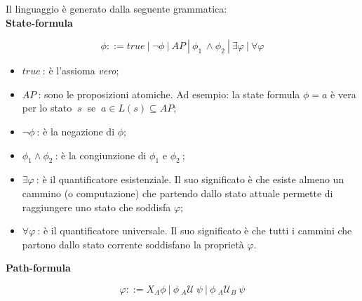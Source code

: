 \noindent Il linguaggio è generato dalla seguente grammatica:
\\

\textbf{{State-formula}}

\begin{equation}
 \phi ::= true\ |\ \neg \phi\ |\ AP\ |\ \phi_1 \ \wedge \phi_2\ |\ \exists\varphi\ |\ \forall\varphi
\end{equation}

\begin{itemize}
 \item $true\ $: è l'assioma \emph{vero};
 
 \item $AP\ $: sono le proposizioni atomiche. Ad esempio: la state formula $\phi = a$ è vera per lo stato $\ s\ $ se $\ a \in L(s) \subseteq AP$;
 
 \item $\neg \phi\ $: è la negazione di $\phi$;
 
 \item $\phi_1 \wedge \phi_2\ $: è la congiunzione di $\phi_1$ e $ \phi_2\ $;
 
 \item $\exists\varphi\ $: è il quantificatore esistenziale. Il suo significato è che esiste almeno un cammino (o computazione) che partendo dallo stato attuale permette di raggiungere uno stato che soddisfa $\varphi$;
 
 \item $\forall\varphi\ $: è il quantificatore universale. Il suo significato è che tutti i cammini che partono dallo stato corrente soddisfano la proprietà $\varphi$.
\end{itemize}


\textbf{{Path-formula}}

\begin{equation}
 \varphi ::= X_A \phi\ |\ \phi\ {}_{A}\mathcal{U}\ \psi\ |\ \phi\ {}_{A}\mathcal{U}_B\ \psi
\end{equation}

